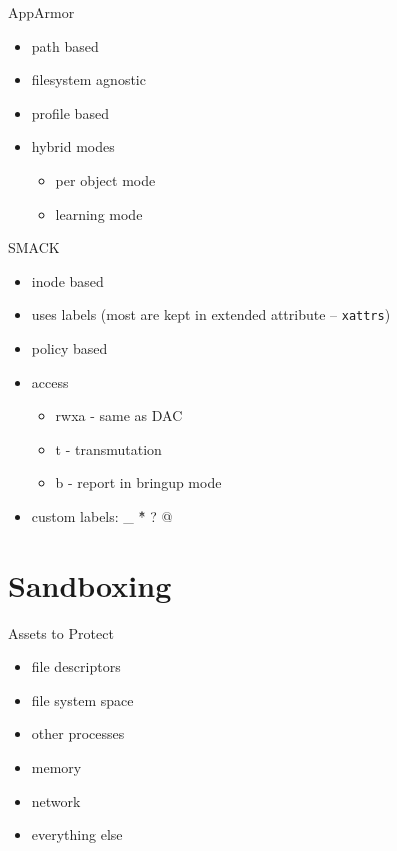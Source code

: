 \documentclass{curs}
\begin{document}
\begin{frame}{AppArmor}
  \begin{itemize}
    \item path based
    \item filesystem agnostic
    \item profile based
    \item hybrid modes
      \begin{itemize}
        \item per object mode
        \item learning mode
      \end{itemize}
  \end{itemize}
\end{frame}

\begin{frame}{SMACK}
  \begin{itemize}
    \item inode based
    \item uses labels (most are kept in extended attribute -- \texttt{xattrs})
    \item policy based
    \item access
      \begin{itemize}
        \item rwxa - same as DAC
        \item t - transmutation
        \item b - report in bringup mode
      \end{itemize}
    \item custom labels: \_ \^ * ? @
  \end{itemize}
\end{frame}


\section{Sandboxing}

\begin{frame}{Assets to Protect}
  \begin{itemize}
    \item file descriptors
    \item file system space
    \item other processes
    \item memory
    \item network
    \item everything else
  \end{itemize}
\end{frame}
\end{document}
